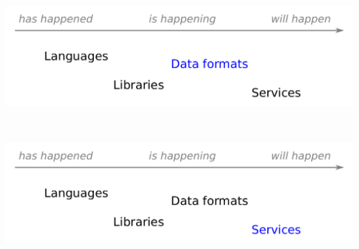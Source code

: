 \documentclass[aspectratio=169]{beamer}
\begin{document}
\begin{frame}{\mbox{ }}
\vspace{0.5 cm}

\begin{center}
\includegraphics[width=0.9\linewidth]{img/topics-3.pdf}
\end{center}
\end{frame}

\begin{frame}{\mbox{ }}
\vspace{0.5 cm}

\begin{center}
\includegraphics[width=0.9\linewidth]{img/topics-4.pdf}
\end{center}
\end{frame}
\end{document}
